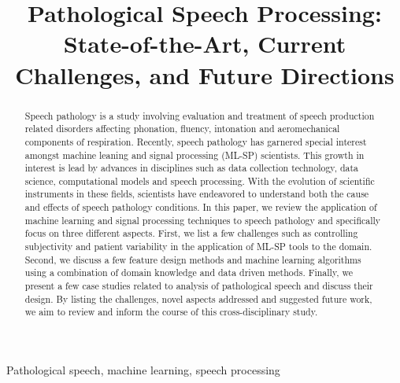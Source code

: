 \documentclass{article}
\title{Pathological Speech Processing:\\State-of-the-Art, Current Challenges, and Future Directions}
\begin{document}
\ninept
%
\maketitle
%
\begin{abstract}
Speech pathology is a study involving evaluation and treatment of speech production related disorders affecting phonation, fluency, intonation and aeromechanical components of respiration.
Recently, speech pathology has garnered special interest amongst machine leaning and signal processing (ML-SP) scientists.
This growth in interest is lead by advances in disciplines such as data collection technology, data science, computational models and speech processing. 
With the evolution of scientific instruments in these fields, scientists have endeavored to understand both the cause and effects of speech pathology conditions.  
In this paper, we review the application of machine learning and signal processing techniques to speech pathology and specifically focus on three different aspects.
First, we list a few challenges such as controlling subjectivity and patient variability in the application of ML-SP tools to the domain.
Second, we discuss a few feature design methods and machine learning algorithms using a combination of domain knowledge and data driven methods.
Finally, we present a few case studies related to analysis of pathological speech and discuss their design. 
By listing the challenges, novel aspects addressed and suggested future work, we aim to review and inform the course of this cross-disciplinary study.
    
 
\end{abstract}
%
\begin{keywords}
Pathological speech, machine learning, speech processing 
\end{keywords}
%
\end{document}
